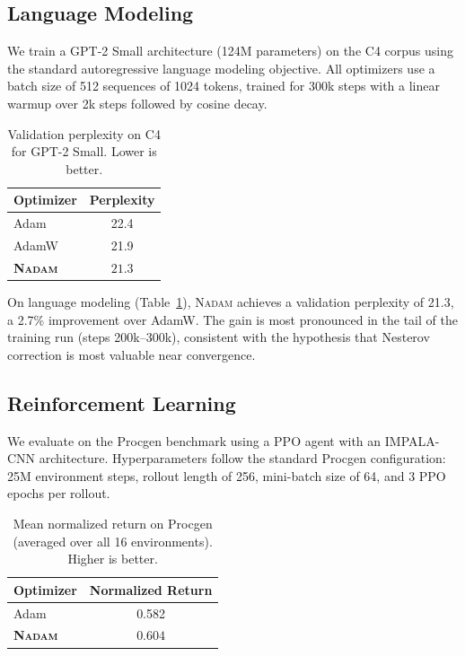 \documentclass[11pt,twoside,openright]{book}
\begin{document}
\subsection{Language Modeling}

We train a GPT-2 Small architecture (124M parameters) on the C4 corpus using the standard
autoregressive language modeling objective. All optimizers use a batch size of 512 sequences of
1024 tokens, trained for 300k steps with a linear warmup over 2k steps followed by cosine decay.

\begin{table}[tb]
  \centering
  \caption{Validation perplexity on C4 for GPT-2 Small. Lower is better.}
  \label{tab:c4}
  \begin{tabular}{@{}lc@{}}
    \toprule
    \textbf{Optimizer} & \textbf{Perplexity}\\
    \midrule
    Adam            & 22.4\\
    AdamW           & 21.9\\
    \textbf{\textsc{Nadam}} & $\mathbf{21.3}$\\
    \bottomrule
  \end{tabular}
\end{table}

On language modeling (Table~\ref{tab:c4}), \textsc{Nadam} achieves a validation perplexity of
21.3, a 2.7\% improvement over AdamW. The gain is most pronounced in the tail of the training
run (steps 200k--300k), consistent with the hypothesis that Nesterov correction is most valuable
near convergence.

\subsection{Reinforcement Learning}

We evaluate on the Procgen benchmark \cite{cobbe2020} using a PPO agent with an IMPALA-CNN
architecture. Hyperparameters follow the standard Procgen configuration: 25M environment steps,
rollout length of 256, mini-batch size of 64, and 3 PPO epochs per rollout.

\begin{table}[tb]
  \centering
  \caption{Mean normalized return on Procgen (averaged over all 16 environments). Higher is
    better.}
  \label{tab:procgen}
  \begin{tabular}{@{}lc@{}}
    \toprule
    \textbf{Optimizer} & \textbf{Normalized Return}\\
    \midrule
    Adam  & 0.582\\
    \textbf{\textsc{Nadam}} & $\mathbf{0.604}$\\
    \bottomrule
  \end{tabular}
\end{table}
\end{document}

